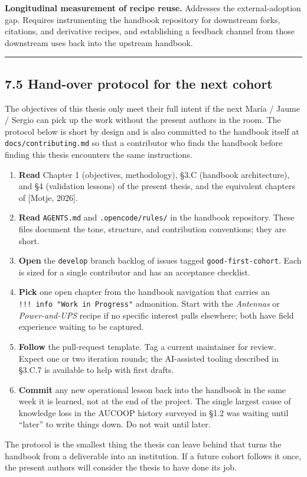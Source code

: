 \textbf{Longitudinal measurement of recipe reuse.} Addresses the
external-adoption gap. Requires instrumenting the handbook repository
for downstream forks, citations, and derivative recipes, and
establishing a feedback channel from those downstream uses back into the
upstream handbook.

\begin{center}\rule{0.5\linewidth}{0.5pt}\end{center}

\hypertarget{hand-over-protocol-for-the-next-cohort}{%
\subsection{7.5 Hand-over protocol for the next
cohort}\label{hand-over-protocol-for-the-next-cohort}}

The objectives of this thesis only meet their full intent if the next
María / Jaume / Sergio can pick up the work without the present authors
in the room. The protocol below is short by design and is also committed
to the handbook itself at \texttt{docs/contributing.md} so that a
contributor who finds the handbook before finding this thesis encounters
the same instructions.

\begin{enumerate}
\def\labelenumi{\arabic{enumi}.}
\tightlist
\item
  \textbf{Read} Chapter 1 (objectives, methodology), §3.C (handbook
  architecture), and §4 (validation lessons) of the present thesis, and
  the equivalent chapters of {[}Motje, 2026{]}.
\item
  \textbf{Read} \texttt{AGENTS.md} and \texttt{.opencode/rules/} in the
  handbook repository. These files document the tone, structure, and
  contribution conventions; they are short.
\item
  \textbf{Open} the \texttt{develop} branch backlog of issues tagged
  \texttt{good-first-cohort}. Each is sized for a single contributor and
  has an acceptance checklist.
\item
  \textbf{Pick} one open chapter from the handbook navigation that
  carries an \texttt{!!!\ info\ "Work\ in\ Progress"} admonition. Start
  with the \emph{Antennas} or \emph{Power-and-UPS} recipe if no specific
  interest pulls elsewhere; both have field experience waiting to be
  captured.
\item
  \textbf{Follow} the pull-request template. Tag a current maintainer
  for review. Expect one or two iteration rounds; the AI-assisted
  tooling described in §3.C.7 is available to help with first drafts.
\item
  \textbf{Commit} any new operational lesson back into the handbook in
  the same week it is learned, not at the end of the project. The single
  largest cause of knowledge loss in the AUCOOP history surveyed in §1.2
  was waiting until ``later'' to write things down. Do not wait until
  later.
\end{enumerate}

The protocol is the smallest thing the thesis can leave behind that
turns the handbook from a deliverable into an institution. If a future
cohort follows it once, the present authors will consider the thesis to
have done its job.
